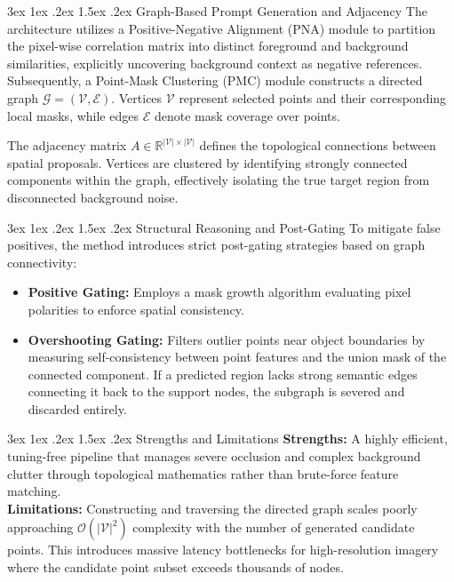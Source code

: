 \documentclass[journal,12pt,onecolumn,draftclsnofoot]{IEEEtran}
\makeatletter
\renewcommand{\subsection}{\@startsection{subsection}{2}{\z@}%
    {3ex \@plus 1ex \@minus .2ex}%
    {1.5ex \@plus.2ex}%
    {\normalfont\large\bfseries}}
\makeatother
\begin{document}
\subsection{Graph-Based Prompt Generation and Adjacency}
The architecture utilizes a Positive-Negative Alignment (PNA) module to partition the pixel-wise correlation matrix into distinct foreground and background similarities, explicitly uncovering background context as negative references. Subsequently, a Point-Mask Clustering (PMC) module constructs a directed graph $\mathcal{G} = (\mathcal{V}, \mathcal{E})$. Vertices $\mathcal{V}$ represent selected points and their corresponding local masks, while edges $\mathcal{E}$ denote mask coverage over points. 

The adjacency matrix $A \in \mathbb{R}^{|\mathcal{V}| \times |\mathcal{V}|}$ defines the topological connections between spatial proposals. Vertices are clustered by identifying strongly connected components within the graph, effectively isolating the true target region from disconnected background noise.

\subsection{Structural Reasoning and Post-Gating}
To mitigate false positives, the method introduces strict post-gating strategies based on graph connectivity:
\begin{itemize}
    \item \textbf{Positive Gating:} Employs a mask growth algorithm evaluating pixel polarities to enforce spatial consistency.
    \item \textbf{Overshooting Gating:} Filters outlier points near object boundaries by measuring self-consistency between point features and the union mask of the connected component. If a predicted region lacks strong semantic edges connecting it back to the support nodes, the subgraph is severed and discarded entirely.
\end{itemize}

\subsection{Strengths and Limitations}
\textbf{Strengths:} A highly efficient, tuning-free pipeline that manages severe occlusion and complex background clutter through topological mathematics rather than brute-force feature matching. \\
\textbf{Limitations:} Constructing and traversing the directed graph scales poorly approaching $\mathcal{O}(|\mathcal{V}|^2)$ complexity with the number of generated candidate points. This introduces massive latency bottlenecks for high-resolution imagery where the candidate point subset exceeds thousands of nodes.
\end{document}
